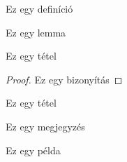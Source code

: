 \begin{definition}
Ez egy definíció
\end{definition}

\begin{lemma}
Ez egy lemma
\end{lemma}

\begin{theorem}
Ez egy tétel
\end{theorem}

\begin{proof}
Ez egy bizonyítás
\end{proof}

\begin{corollary}
Ez egy tétel
\end{corollary}

\begin{remark}
Ez egy megjegyzés
\end{remark}

\begin{example}
Ez egy példa
\end{example}

